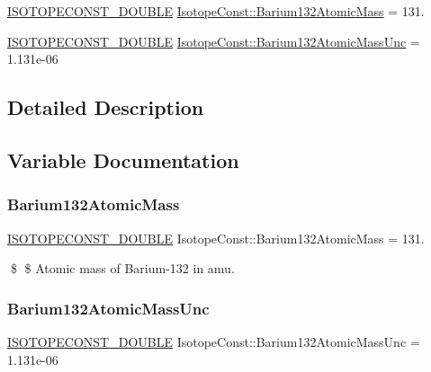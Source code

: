 \begin{DoxyCompactItemize}
\item 
\mbox{\hyperlink{group___isotope_const-_macros_ga8f45a7272ce02c0b4c65c44636ed719a}{I\+S\+O\+T\+O\+P\+E\+C\+O\+N\+S\+T\+\_\+\+D\+O\+U\+B\+LE}} \mbox{\hyperlink{group___isotope_const-_barium-_ba132_gad26fee36b5037811e859339e73ed5c2e}{Isotope\+Const\+::\+Barium132\+Atomic\+Mass}} = 131.
\item 
\mbox{\hyperlink{group___isotope_const-_macros_ga8f45a7272ce02c0b4c65c44636ed719a}{I\+S\+O\+T\+O\+P\+E\+C\+O\+N\+S\+T\+\_\+\+D\+O\+U\+B\+LE}} \mbox{\hyperlink{group___isotope_const-_barium-_ba132_gac780d1b7eae3582939abdd5da902de57}{Isotope\+Const\+::\+Barium132\+Atomic\+Mass\+Unc}} = 1.\+131e-\/06
\end{DoxyCompactItemize}


\subsection{Detailed Description}


\subsection{Variable Documentation}
\mbox{\label{group___isotope_const-_barium-_ba132_gad26fee36b5037811e859339e73ed5c2e}} 
\subsubsection{\texorpdfstring{Barium132\+Atomic\+Mass}{Barium132AtomicMass}}
{\footnotesize\ttfamily \mbox{\hyperlink{group___isotope_const-_macros_ga8f45a7272ce02c0b4c65c44636ed719a}{I\+S\+O\+T\+O\+P\+E\+C\+O\+N\+S\+T\+\_\+\+D\+O\+U\+B\+LE}} Isotope\+Const\+::\+Barium132\+Atomic\+Mass = 131.}

\$ \$ Atomic mass of Barium-\/132 in amu. \mbox{\label{group___isotope_const-_barium-_ba132_gac780d1b7eae3582939abdd5da902de57}} 
\subsubsection{\texorpdfstring{Barium132\+Atomic\+Mass\+Unc}{Barium132AtomicMassUnc}}
{\footnotesize\ttfamily \mbox{\hyperlink{group___isotope_const-_macros_ga8f45a7272ce02c0b4c65c44636ed719a}{I\+S\+O\+T\+O\+P\+E\+C\+O\+N\+S\+T\+\_\+\+D\+O\+U\+B\+LE}} Isotope\+Const\+::\+Barium132\+Atomic\+Mass\+Unc = 1.\+131e-\/06}

